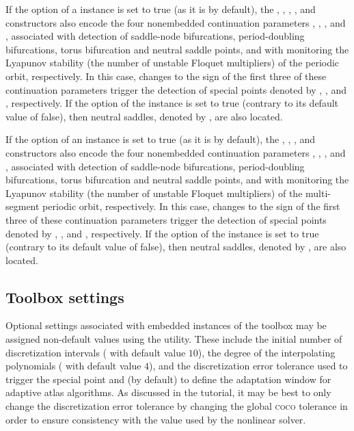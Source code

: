 If the  option of a  instance is set to true (as it is by default), the , , , , and  constructors also encode the four nonembedded continuation parameters , , , and , associated with detection of saddle-node bifurcations, period-doubling bifurcations, torus bifurcation and neutral saddle points, and with monitoring the Lyapunov stability (the number of unstable Floquet multipliers) of the periodic orbit, respectively. In this case, changes to the sign of the first three of these continuation parameters trigger the detection of special points denoted by , , and , respectively. If the  option of the  instance is set to true (contrary to its default value of false), then neutral saddles, denoted by , are also located.

If the  option of an  instance is set to true (as it is by default), the , , , and  constructors also encode the four nonembedded continuation parameters , , , and , associated with detection of saddle-node bifurcations, period-doubling bifurcations, torus bifurcation and neutral saddle points, and with monitoring the Lyapunov stability (the number of unstable Floquet multipliers) of the multi-segment periodic orbit, respectively. In this case, changes to the sign of the first three of these continuation parameters trigger the detection of special points denoted by , , and , respectively. If the  option of the  instance is set to true (contrary to its default value of false), then neutral saddles, denoted by , are also located.

\subsection{Toolbox settings}
Optional settings associated with embedded instances of the  toolbox may be assigned non-default values using the  utility. These include the initial number of discretization intervals ( with default value $10$), the degree of the interpolating polynomials ( with default value $4$), and the discretization error tolerance used to trigger the  special point and (by default) to define the adaptation window for adaptive atlas algorithms. As discussed in the  tutorial, it may be best to only change the discretization error tolerance by changing the global \textsc{coco} tolerance in order to ensure consistency with the value used by the nonlinear solver.

